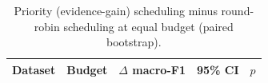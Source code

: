 \begin{table}[t]
\centering\small
\begin{tabular}{lcccc}
\toprule
Dataset & Budget & $\Delta$ macro-F1 & 95\% CI & $p$ \\
\midrule

\bottomrule
\end{tabular}
\caption{Priority (evidence-gain) scheduling minus round-robin scheduling at equal budget (paired bootstrap).}
\label{tab:priority}
\end{table}
